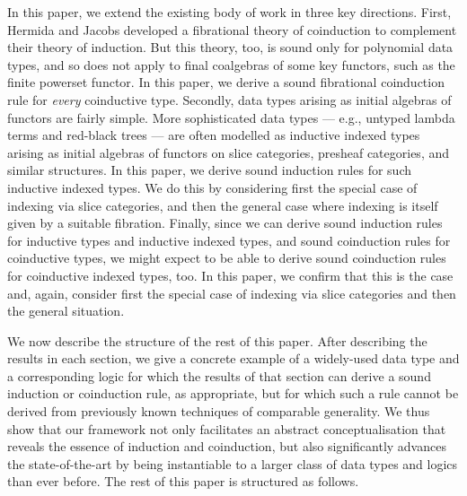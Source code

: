 \documentclass{LMCS}
\theoremstyle{plain}
\theoremstyle{remark}
\theoremstyle{definition}
\begin{document}
In this paper, we extend the existing body of work in three key
directions. First, Hermida and Jacobs developed a fibrational theory
of coinduction to complement their theory of induction. But this
theory, too, is sound only for polynomial data types, and so does not
apply to final coalgebras of some key functors, such as the finite
powerset functor. In this paper, we derive a sound fibrational
coinduction rule for {\em every} coinductive type. Secondly, data
types arising as initial algebras of functors are fairly simple. More
sophisticated data types --- e.g., untyped lambda terms and red-black
trees --- are often modelled as inductive indexed types arising as
initial algebras of functors on slice categories, presheaf categories,
and similar structures. In this paper, we derive sound induction rules
for such inductive indexed types.  We do this by considering first the
special case of indexing via slice categories, and then the general
case where indexing is itself given by a suitable fibration.  Finally,
since we can derive sound induction rules for inductive types and
inductive indexed types, and sound coinduction rules for coinductive
types, we might expect to be able to derive sound coinduction rules
for coinductive indexed types, too. In this paper, we confirm that
this is the case and, again, consider first the special case of
indexing via slice categories and then the general situation.

We now describe the structure of the rest of this paper. After
describing the results in each section, we give a concrete example of
a widely-used data type and a corresponding logic for which the
results of that section can derive a sound induction or coinduction
rule, as appropriate, but for which such a rule cannot be derived from
previously known techniques of comparable generality. We thus show
that our framework not only facilitates an abstract conceptualisation
that reveals the essence of induction and coinduction, but also
significantly advances the state-of-the-art by being instantiable to a
larger class of data types and logics than ever before.  The rest of
this paper is structured as follows.
\end{document}
